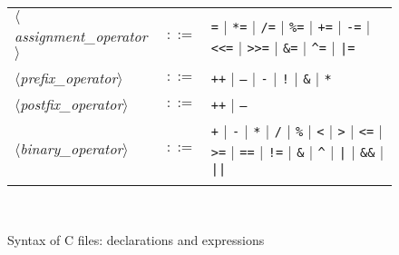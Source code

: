 \documentclass[a4paper,12pt]{report}
\newcommand{\te}[1]{\texttt{#1}}
\newcommand{\nt}[1]{$\langle$\textsl{#1}$\rangle$}
\begin{document}
\begin{figure}[htbp]
\begin{center}
\begin{tabular}{lrl}
  \nt{assignment\_operator}
    & $::=$ & \te{=} $|$ \te{*=} $|$ \te{/=} $|$ \te{\%=} $|$ \te{+=} 
          $|$ \te{-=} $|$ \te{<<=} $|$ \te{>>=} $|$ \te{\&=} $|$ \te{\^{}=}
          $|$ \te{|=}
  \\[0.1em]

  \nt{prefix\_operator}
    & $::=$ & \te{++} $|$ \te{--} $|$ \te{-} $|$ \te{!} $|$ \te{\&}
          $|$ \te{*}
  \\[0.1em]

  \nt{postfix\_operator}
    & $::=$ & \te{++} $|$ \te{--}
  \\[0.1em]

  \nt{binary\_operator}
    & $::=$ & \te{+} $|$ \te{-} $|$ \te{*} $|$ \te{/} $|$ \te{\%} $|$ \te{<} 
          $|$ \te{>} $|$ \te{<=} $|$ \te{>=} $|$ \te{==} $|$ \te{!=} 
          $|$ \te{\&} $|$ \te{\^{}} $|$ \te{|} $|$ \te{\&\&} $|$ \te{||} \\
  \\[0.1em]

\end{tabular}\\
\hrulefill
\caption{Syntax of C files: declarations and expressions}
\label{fig:cfiles:a}
\end{center}           
\end{figure}
\end{document}
